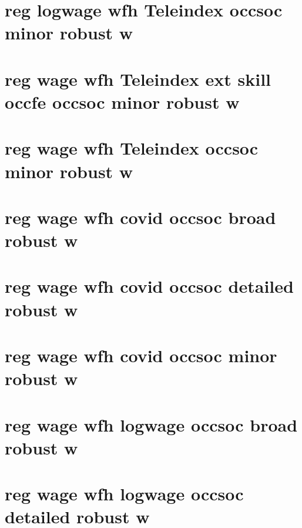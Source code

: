 \documentclass{article}
\begin{document}
\tableofcontents
\newpage
\section{reg logwage wfh Teleindex occsoc minor robust w}

\newpage
\section{reg wage wfh Teleindex ext skill occfe occsoc minor robust w}

\newpage
\section{reg wage wfh Teleindex occsoc minor robust w}

\newpage
\section{reg wage wfh  covid occsoc broad robust w}

\newpage
\section{reg wage wfh  covid occsoc detailed robust w}

\newpage
\section{reg wage wfh  covid occsoc minor robust w}

\newpage
\section{reg wage wfh  logwage occsoc broad robust w}

\newpage
\section{reg wage wfh  logwage occsoc detailed robust w}

\newpage
\end{document}
